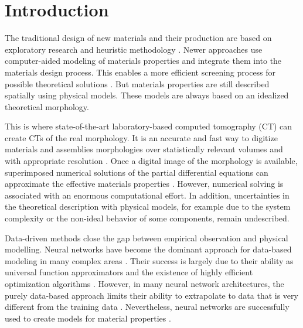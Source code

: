 \section{Introduction}
\label{Introduction}

The traditional design of new materials and their production are based on exploratory research and heuristic methodology \cite{morgan2020opportunities,butler2018machine,MolMatSurv}. Newer approaches use computer-aided modeling of materials properties and integrate them into the materials design process. This enables a more efficient screening process for possible theoretical solutions \cite{ramprasad2017machine, sousa2021material}. But materials properties are still described spatially using physical models. These models are always based on an idealized theoretical morphology. 

This is where state-of-the-art laboratory-based computed tomography (CT) can create CTs of the real morphology. It is an accurate and fast way to digitize materials and assemblies morphologies over statistically relevant volumes and with appropriate resolution \cite{tom3, tom2, tom1}. Once a digital image of the morphology is available, superimposed numerical solutions of the partial differential equations can approximate the effective materials properties \cite{num2, num1}. However, numerical solving is associated with an enormous computational effort. In addition, uncertainties in the theoretical description with physical models, for example due to the system complexity or the non-ideal behavior of some components, remain undescribed.

Data-driven methods close the gap between empirical observation and physical modelling. Neural networks have become the dominant approach for data-based modeling in many complex areas \cite{YOLO,UNET, AlphaGo}. Their success is largely due to their ability as universal function approximators and the existence of highly efficient optimization algorithms \cite{Optimizers}. However, in many neural network architectures, the purely data-based approach limits their ability to extrapolate to data that is very different from the training data \cite{IPNN}. Nevertheless, neural networks are successfully used to create models for material properties \cite{MLMF2,MLMF1, MatMLSurv,MolMatSurv}.

